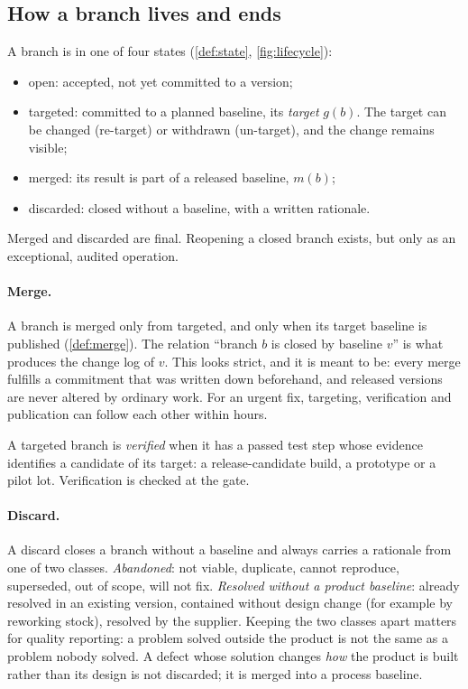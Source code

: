 \subsection{How a branch lives and ends}
\label{sec:model-closing}

A branch is in one of four states (\cref{def:state},
\cref{fig:lifecycle}):
\begin{itemize}[leftmargin=1.5em,itemsep=1pt,topsep=2pt]
  \item \textsf{open}: accepted, not yet committed to a version;
  \item \textsf{targeted}: committed to a planned baseline, its
        \emph{target} $g(b)$. The target can be changed (re-target) or
        withdrawn (un-target), and the change remains visible;
  \item \textsf{merged}: its result is part of a released baseline,
        $m(b)$;
  \item \textsf{discarded}: closed without a baseline, with a written
        rationale.
\end{itemize}
Merged and discarded are final. Reopening a closed branch exists, but only
as an exceptional, audited operation.



\paragraph{Merge.}
A branch is merged only from \textsf{targeted}, and only when its target
baseline is published (\cref{def:merge}). The relation ``branch $b$ is
closed by baseline $v$'' is what produces the change log of $v$. This
looks strict, and it is meant to be: every merge fulfills a commitment that
was written down beforehand, and released versions are never altered by
ordinary work. For an urgent fix, targeting, verification and publication
can follow each other within hours.

A targeted branch is \emph{verified} when it has a passed test step whose
evidence identifies a candidate of its target: a release-candidate build,
a prototype or a pilot lot. Verification is checked at the gate.

\paragraph{Discard.}
A discard closes a branch without a baseline and always carries a
rationale from one of two classes. \emph{Abandoned}: not viable,
duplicate, cannot reproduce, superseded, out of scope, will not fix.
\emph{Resolved without a product baseline}: already resolved in an
existing version, contained without design change (for example by
reworking stock), resolved by the supplier. Keeping the two classes apart
matters for quality reporting: a problem solved outside the product is not
the same as a problem nobody solved. A defect whose solution changes
\emph{how} the product is built rather than its design is not discarded;
it is merged into a process baseline.

